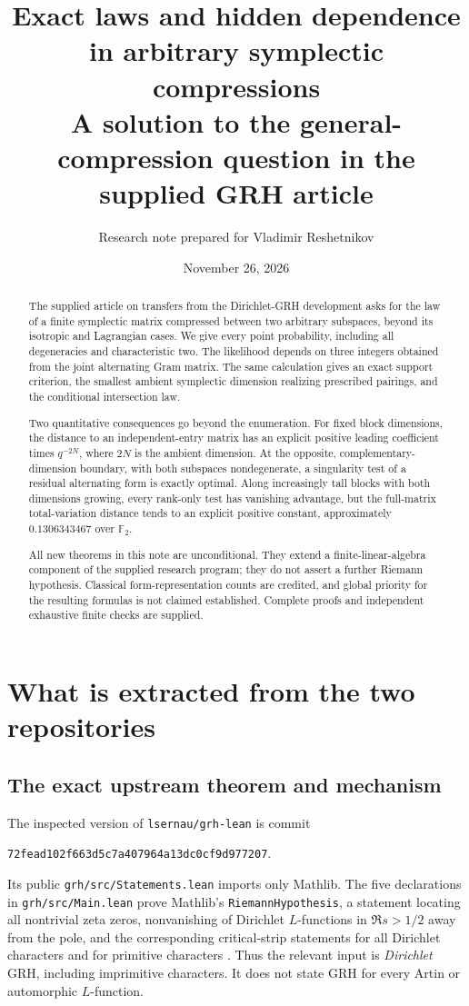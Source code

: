\documentclass[11pt]{article}
\title{\textbf{Exact laws and hidden dependence\\in arbitrary symplectic compressions}\\[0.6em]
\large A solution to the general-compression question in the supplied GRH article}
\author{Research note prepared for Vladimir Reshetnikov}
\date{November 26, 2026}
\numberwithin{equation}{section}
\theoremstyle{definition}
\theoremstyle{remark}
\newcommand{\F}{\mathbb F}
\newcommand{\code}[1]{\nolinkurl{#1}}
\newcommand{\sourcecommit}{\texttt{72fead102f663d5c7a407964a13dc0cf9d977207}}
\begin{document}
\maketitle
\begin{abstract}
The supplied article on transfers from the Dirichlet-GRH development asks for the law of a finite symplectic matrix compressed between two arbitrary subspaces, beyond its isotropic and Lagrangian cases. We give every point probability, including all degeneracies and characteristic two. The likelihood depends on three integers obtained from the joint alternating Gram matrix. The same calculation gives an exact support criterion, the smallest ambient symplectic dimension realizing prescribed pairings, and the conditional intersection law.

Two quantitative consequences go beyond the enumeration. For fixed block dimensions, the distance to an independent-entry matrix has an explicit positive leading coefficient times $q^{-2N}$, where $2N$ is the ambient dimension. At the opposite, complementary-dimension boundary, with both subspaces nondegenerate, a singularity test of a residual alternating form is exactly optimal. Along increasingly tall blocks with both dimensions growing, every rank-only test has vanishing advantage, but the full-matrix total-variation distance tends to an explicit positive constant, approximately $0.1306343467$ over $\F_2$.

All new theorems in this note are unconditional. They extend a finite-linear-algebra component of the supplied research program; they do not assert a further Riemann hypothesis. Classical form-representation counts are credited, and global priority for the resulting formulas is not claimed established. Complete proofs and independent exhaustive finite checks are supplied.
\end{abstract}
\clearpage
\tableofcontents
\clearpage

\section{What is extracted from the two repositories}
\label{sec:sources}

\subsection{The exact upstream theorem and mechanism}
The inspected version of \code{lsernau/grh-lean} is commit
\begin{center}\sourcecommit.\end{center}
Its public \code{grh/src/Statements.lean} imports only Mathlib. The five declarations in \code{grh/src/Main.lean} prove Mathlib's \code{RiemannHypothesis}, a statement locating all nontrivial zeta zeros, nonvanishing of Dirichlet $L$-functions in $\Re s>1/2$ away from the pole, and the corresponding critical-strip statements for all Dirichlet characters and for primitive characters \cite{upstream}. Thus the relevant input is \emph{Dirichlet} GRH, including imprimitive characters. It does not state GRH for every Artin or automorphic $L$-function.
\end{document}
